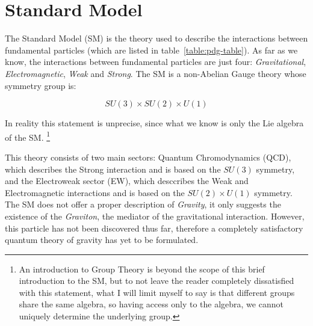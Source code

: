 
\chapter{Standard Model}



The Standard Model (SM) is the theory used to describe the interactions between fundamental particles 
(which are listed in table~\ref{table:pdg-table}).
As far as we know, the interactions between fundamental particles are just four: \textit{Gravitational}, 
\textit{Electromagnetic}, \textit{Weak} and \textit{Strong}.
The SM is a non-Abelian Gauge theory whose symmetry group is:

\begin{equation}
    SU(3) \times SU(2) \times U(1)
\end{equation}

In reality this statement is unprecise, since what we know is only the Lie algebra of the SM.%
\footnote{
    An introduction to Group Theory is beyond the scope of this brief introduction to the SM, 
    but to not leave the reader completely dissatisfied with this statement, 
    what I will limit myself to say is that different groups share the same algebra, so having access only 
    to the algebra, we cannot uniquely determine the underlying group.}

This theory consists of two main sectors: Quantum Chromodynamics (QCD), which describes the Strong interaction 
and is based on the $SU(3)$ symmetry, and the Electroweak sector (EW), which desccribes the Weak 
and Electromagnetic interactions and is based on the $SU(2) \times U(1)$ symmetry.\\
The SM does not offer a proper description of \textit{Gravity}, it only suggests the existence of 
the \textit{Graviton}, the mediator of the gravitational interaction.
However, this particle has not been discovered thus far,  therefore a completely satisfactory quantum 
theory of gravity has yet to be formulated.\\

